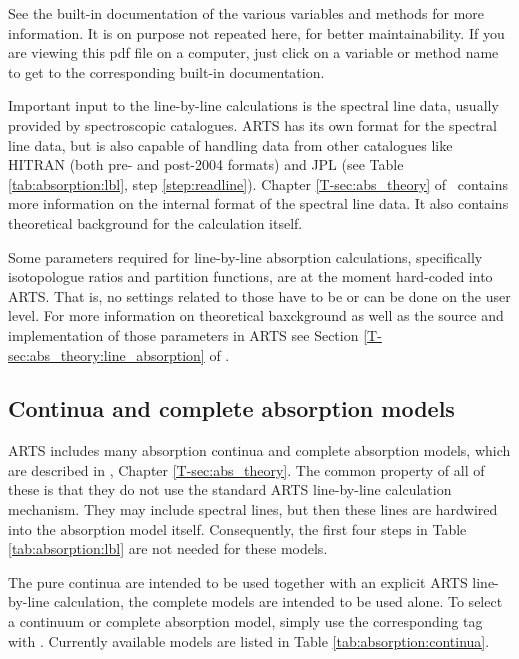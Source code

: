 See the built-in documentation of the various variables and methods
for more information.  It is on purpose not repeated here, for better
maintainability.  If you are viewing this pdf file on a computer, just
click on a variable or method name to get to the corresponding
built-in documentation. 


Important input to the line-by-line calculations is the spectral line data,
usually provided by spectroscopic catalogues. ARTS has its own format for the
spectral line data, but is also capable of handling data from other catalogues
like HITRAN (both pre- and post-2004 formats) and JPL (see Table
\ref{tab:absorption:lbl}, step \ref{step:readline}).
Chapter \ref{T-sec:abs_theory} of \theory\ contains more information on
the internal format of the spectral line data.  It also contains
theoretical background for the calculation itself.

Some parameters required for line-by-line absorption calculations,
specifically isotopologue ratios and partition functions, are at the moment
hard-coded into ARTS. That is, no settings related to those have to be or
can be done on the user level. For more information on theoretical baxckground
as well as the source and implementation of those parameters in ARTS see Section
\ref{T-sec:abs_theory:line_absorption} of \theory.

\subsection{Continua and complete absorption models}
\label{sec:absorption:continua}

ARTS includes many absorption continua and complete absorption models,
which are described in \theory, Chapter \ref{T-sec:abs_theory}.  The
common property of all of these is that they do not use the standard
ARTS line-by-line calculation mechanism.  They may include spectral
lines, but then these lines are hardwired into the absorption model
itself.  Consequently, the first four steps in Table
\ref{tab:absorption:lbl} are not needed for these models.  

The pure continua are intended to be used together with an explicit ARTS
line-by-line calculation, the complete models are intended to be used alone.
To select a continuum or complete absorption model, simply use the
corresponding tag with .  Currently available
models are listed in Table \ref{tab:absorption:continua}.

